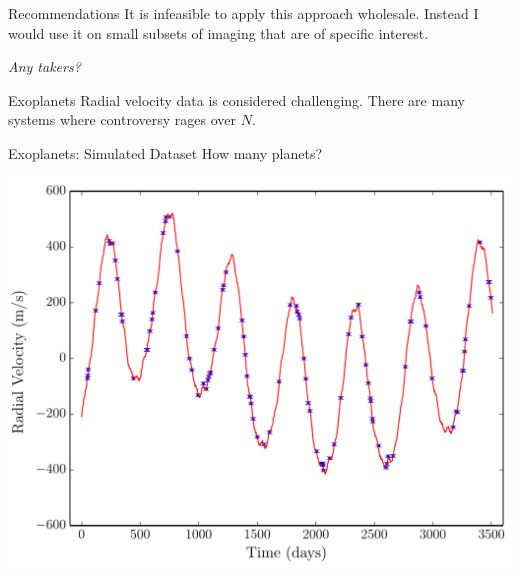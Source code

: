 \begin{frame}[t]{Recommendations}
It is infeasible to apply this approach wholesale.
Instead I would use it on small subsets of imaging that are of specific interest.

\vspace{20pt}

\begin{center}
{\it Any takers?}
\end{center}
\end{frame}



\begin{frame}[t]{Exoplanets}
Radial velocity data is considered challenging. There are many systems where
controversy rages over $N$.
\end{frame}

\begin{frame}[t]{Exoplanets: Simulated Dataset}
How many planets?
\begin{center}
\includegraphics[scale=0.35]{ExoplanetFigures/fake_data.pdf}
\end{center}
\end{frame}

